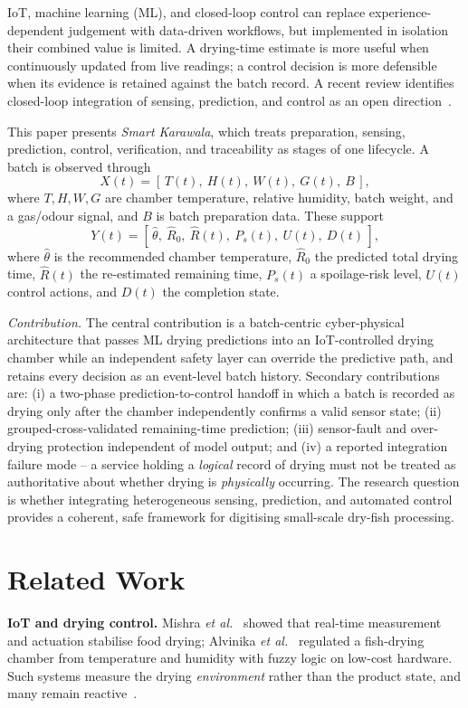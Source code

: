 \documentclass[conference]{IEEEtran}
\begin{document}
IoT, machine learning (ML), and closed-loop control can replace
experience-dependent judgement with data-driven workflows, but implemented
in isolation their combined value is limited. A drying-time estimate is
more useful when continuously updated from live readings; a control
decision is more defensible when its evidence is retained against the batch
record. A recent review identifies closed-loop integration of sensing,
prediction, and control as an open direction~\cite{b3}.

This paper presents \emph{Smart Karawala}, which treats preparation,
sensing, prediction, control, verification, and traceability as stages of
one lifecycle. A batch is observed through
\begin{equation}
X(t) = [\,T(t),\ H(t),\ W(t),\ G(t),\ B\,],\label{eq1}
\end{equation}
where $T,H,W,G$ are chamber temperature, relative humidity, batch weight,
and a gas/odour signal, and $B$ is batch preparation data. These support
\begin{equation}
Y(t) = [\,\hat{\theta},\ \hat{R}_{0},\ \hat{R}(t),\ P_{s}(t),\ U(t),\
D(t)\,],\label{eq2}
\end{equation}
where $\hat{\theta}$ is the recommended chamber temperature, $\hat{R}_{0}$
the predicted total drying time, $\hat{R}(t)$ the re-estimated remaining
time, $P_{s}(t)$ a spoilage-risk level, $U(t)$ control actions, and
$D(t)$ the completion state.

\textit{Contribution.} The central contribution is a batch-centric
cyber-physical architecture that passes ML drying predictions into an
IoT-controlled drying chamber while an independent safety layer can
override the predictive path, and retains every decision as an event-level
batch history. Secondary contributions are: (i) a two-phase
prediction-to-control handoff in which a batch is recorded as drying only
after the chamber independently confirms a valid sensor state; (ii)
grouped-cross-validated remaining-time prediction; (iii) sensor-fault and
over-drying protection independent of model output; and (iv) a reported
integration failure mode -- a service holding a \emph{logical} record of
drying must not be treated as authoritative about whether drying is
\emph{physically} occurring. The research question is whether integrating
heterogeneous sensing, prediction, and automated control provides a
coherent, safe framework for digitising small-scale dry-fish processing.

\section{Related Work}
\textbf{IoT and drying control.} Mishra \textit{et al.}~\cite{b1} showed
that real-time measurement and actuation stabilise food drying; Alvinika
\textit{et al.}~\cite{b2} regulated a fish-drying chamber from temperature
and humidity with fuzzy logic on low-cost hardware. Such systems measure
the drying \emph{environment} rather than the product state, and many
remain reactive~\cite{b3}.
\end{document}
